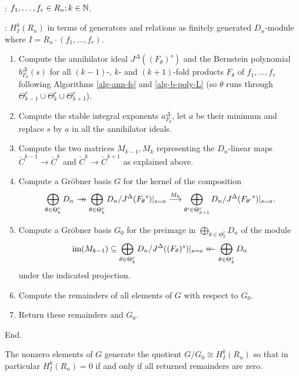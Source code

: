 \begin{alg}~


: $f_1,\ldots,f_r\in R_n; k\in {\mathbb N}$.

: $H_I^k(R_n)$ in terms of generators and relations as finitely
generated $D_n$-module where $I=R_n\cdot(f_1,\ldots,f_r)$.
\begin{enumerate}
\item Compute the annihilator ideal $J^\Delta((F_\theta)^s)$
and the Bernstein 
polynomial $b^\Delta_{F_\theta}(s)$ for all $(k-1)$-, $k$- and $(k+1)$-fold
products $F_\theta$ of 
${f_1},\ldots,{f_r}$ following Algorithms \ref{alg-ann-fs} and \ref{alg-b-poly-L} (so
$\theta$ runs through $\Theta^r_{k-1}\cup \Theta^r_k\cup \Theta^r_{k+1}$).

\item Compute the stable integral exponents $a^\Delta_{F_\theta}$, 
 let $a$
be their minimum
and replace $s$ by $a$ in all the annihilator ideals.

\item Compute the two matrices $M_{k-1},M_k$ representing the
$D_n$-linear maps 
$\check C^{k-1}\to \check C^k$ and $\check C^k\to \check 
C^{k+1}$ as explained above.

\item Compute a Gr\"obner basis $G$ for the kernel of the composition
\[
\bigoplus_{\theta\in\Theta_k^r}D_n\to\hskip-1.7ex\to \bigoplus_{\theta\in\Theta^r_k} 
D_n/J^\Delta({F_\theta}^s)|_{s=a}\stackrel{M_k}{\longrightarrow}
\bigoplus_{\theta'\in
\Theta^r_{k+1}}D_n/J^\Delta({F_{\theta'}}^s)|_{s=a}. 
\]

\item Compute a Gr\"obner basis $G_0$ for the preimage 
in $\bigoplus_{\theta\in\Theta_k^r}D_n$ of the module 
\[
\operatorname{im}(M_{k-1})
\subseteq \bigoplus_{\theta\in\Theta^r_k} 
D_n/J^\Delta((F_\theta)^s)|_{s=a}\leftarrow\hskip-1.7ex\leftarrow \bigoplus_{\theta\in\Theta_k^r}D_n
\]
under the indicated projection.
\item Compute the remainders of all elements of $G$ with
respect to $G_0$. 

\item Return these remainders and $G_0$.
\end{enumerate}
End.
\end{alg}
The nonzero elements of $G$ generate the quotient $G/G_0\cong
H^k_I(R_n)$ so that in particular
$H^k_I(R_n)=0$ if and only if all returned remainders are zero. 

